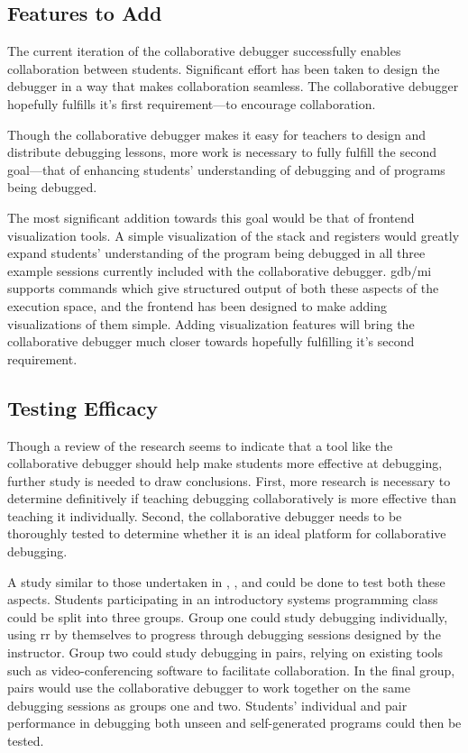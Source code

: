 \documentclass[12pt]{article}
\begin{document}
\subsection{Features to Add}

The current iteration of the collaborative debugger successfully
enables collaboration between students.  Significant effort has been
taken to design the debugger in a way that makes collaboration
seamless.  The collaborative debugger hopefully fulfills it's first
requirement---to encourage collaboration.
\par

Though the collaborative debugger makes it easy for teachers to design
and distribute debugging lessons, more work is necessary to fully
fulfill the second goal---that of enhancing students' understanding of
debugging and of programs being debugged.
\par

The most significant addition towards this goal would be that of
frontend visualization tools.  A simple visualization of the stack and
registers would greatly expand students' understanding of the program
being debugged in all three example sessions currently included with
the collaborative debugger.  gdb/mi supports commands which give
structured output of both these aspects of the execution space, and
the frontend has been designed to make adding visualizations of them
simple.  Adding visualization features will bring the collaborative
debugger much closer towards hopefully fulfilling it's second
requirement.

\subsection{Testing Efficacy}

Though a review of the research seems to indicate that a tool like the
collaborative debugger should help make students more effective at
debugging, further study is needed to draw conclusions.  First, more
research is necessary to determine definitively if teaching debugging
collaboratively is more effective than teaching it individually.
Second, the collaborative debugger needs to be thoroughly tested to
determine whether it is an ideal platform for collaborative debugging.
\par

A study similar to those undertaken in \cite{10.1145/1026487.1008043},
\cite{10.1145/1145287.1145293}, and \cite{10.1145/3361721.3361724}
could be done to test both these aspects.  Students participating in
an introductory systems programming class could be split into three
groups.  Group one could study debugging individually, using rr by
themselves to progress through debugging sessions designed by the
instructor.  Group two could study debugging in pairs, relying on
existing tools such as video-conferencing software to facilitate
collaboration.  In the final group, pairs would use the collaborative
debugger to work together on the same debugging sessions as groups one
and two.  Students' individual and pair performance in debugging both
unseen and self-generated programs could then be tested.
\end{document}
